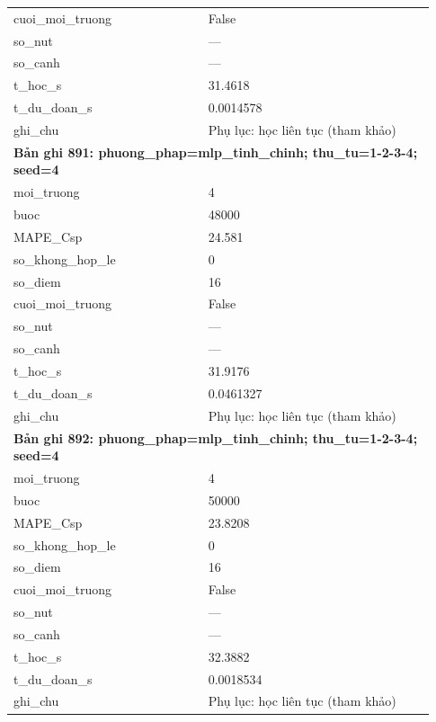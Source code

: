 \begin{longtable}{p{0.43\linewidth}p{0.50\linewidth}}
cuoi\_\allowbreak moi\_\allowbreak truong & False \\
so\_\allowbreak nut & — \\
so\_\allowbreak canh & — \\
t\_\allowbreak hoc\_\allowbreak s & 31.4618 \\
t\_\allowbreak du\_\allowbreak doan\_\allowbreak s & 0.0014578 \\
ghi\_\allowbreak chu & Phụ lục: học liên tục (tham khảo) \\
\midrule
\multicolumn{2}{p{0.95\linewidth}}{\textbf{Bản ghi 891: phuong\_phap=mlp\_tinh\_chinh; thu\_tu=1-2-3-4; seed=4}} \\
moi\_\allowbreak truong & 4 \\
buoc & 48000 \\
MAPE\_\allowbreak Csp & 24.581 \\
so\_\allowbreak khong\_\allowbreak hop\_\allowbreak le & 0 \\
so\_\allowbreak diem & 16 \\
cuoi\_\allowbreak moi\_\allowbreak truong & False \\
so\_\allowbreak nut & — \\
so\_\allowbreak canh & — \\
t\_\allowbreak hoc\_\allowbreak s & 31.9176 \\
t\_\allowbreak du\_\allowbreak doan\_\allowbreak s & 0.0461327 \\
ghi\_\allowbreak chu & Phụ lục: học liên tục (tham khảo) \\
\midrule
\multicolumn{2}{p{0.95\linewidth}}{\textbf{Bản ghi 892: phuong\_phap=mlp\_tinh\_chinh; thu\_tu=1-2-3-4; seed=4}} \\
moi\_\allowbreak truong & 4 \\
buoc & 50000 \\
MAPE\_\allowbreak Csp & 23.8208 \\
so\_\allowbreak khong\_\allowbreak hop\_\allowbreak le & 0 \\
so\_\allowbreak diem & 16 \\
cuoi\_\allowbreak moi\_\allowbreak truong & False \\
so\_\allowbreak nut & — \\
so\_\allowbreak canh & — \\
t\_\allowbreak hoc\_\allowbreak s & 32.3882 \\
t\_\allowbreak du\_\allowbreak doan\_\allowbreak s & 0.0018534 \\
ghi\_\allowbreak chu & Phụ lục: học liên tục (tham khảo) \\

\end{longtable}
